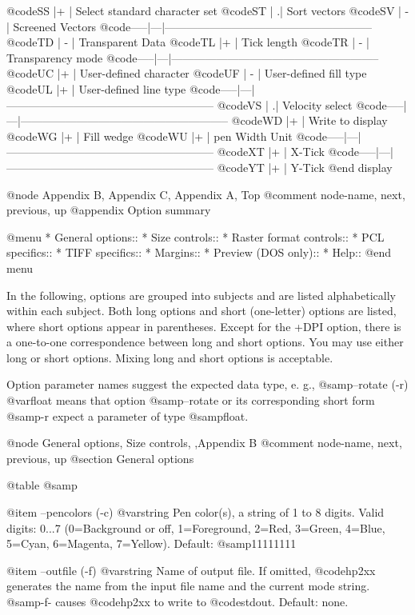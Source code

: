 @code{SS   |+  | Select standard character set}
@code{ST   |  .| Sort vectors}
@code{SV   | - | Screened Vectors}
@code{-----|---|--------------------------------------------------------}
@code{TD   | - | Transparent Data}
@code{TL   |+  | Tick length}
@code{TR   | - | Transparency mode}
@code{-----|---|--------------------------------------------------------}
@code{UC   |+  | User-defined character}
@code{UF   | - | User-defined fill type}
@code{UL   |+  | User-defined line type}
@code{-----|---|--------------------------------------------------------}
@code{VS   |  .| Velocity select}
@code{-----|---|--------------------------------------------------------}
@code{WD   |+  | Write to display}
@code{WG   |+  | Fill wedge}
@code{WU   |+  | pen Width Unit}
@code{-----|---|--------------------------------------------------------}
@code{XT   |+  | X-Tick}
@code{-----|---|--------------------------------------------------------}
@code{YT   |+  | Y-Tick}
@end display



@node Appendix B, Appendix C, Appendix A, Top
@comment  node-name,  next,  previous,  up
@appendix   Option summary

@menu
* General options::
* Size controls::
* Raster format controls::
* PCL specifics::
* TIFF specifics::
* Margins::
* Preview (DOS only)::
* Help::
@end menu

In the following, options are grouped into subjects and
are listed alphabetically within each subject. Both long options and
short (one-letter) options are listed, where short options appear in
parentheses. Except for the +DPI option, there is a one-to-one correspondence
between long and short options. You may use either long or short options.
Mixing long and short options is acceptable.

Option parameter names suggest the expected data type, e. g.,
@samp{--rotate (-r) @var{float}} means that option @samp{--rotate} or its
corresponding short form @samp{-r} expect a parameter of type @samp{float}.

@node General options, Size controls, ,Appendix B
@comment  node-name,  next,  previous,  up
@section General options

@table @samp

@item --pencolors (-c) @var{string}
Pen color(s), a string of 1 to 8 digits.
Valid digits: 0...7 (0=Background or off, 1=Foreground, 2=Red, 3=Green,
4=Blue, 5=Cyan, 6=Magenta, 7=Yellow). Default: @samp{11111111}

@item --outfile (-f) @var{string}
Name of output file. If omitted, @code{hp2xx} generates the name from
the input file name and the current mode string. @samp{-f-} causes
@code{hp2xx} to write to @code{stdout}. Default: none.

